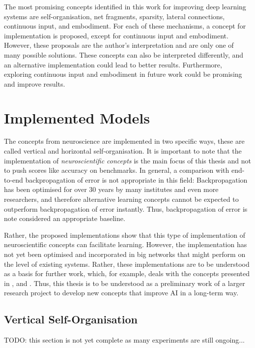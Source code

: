 The most promising concepts identified in this work for improving deep learning systems are self-organisation, net fragments, sparsity, lateral connections, continuous input, and embodiment. For each of these mechanisms, a concept for implementation is proposed, except for continuous input and embodiment. However, these proposals are the author's interpretation and are only one of many possible solutions. These concepts can also be interpreted differently, and an alternative implementation could lead to better results. Furthermore, exploring continuous input and embodiment in future work could be promising and improve results. 


\section{Implemented Models}
The concepts from neuroscience are implemented in two specific ways, these are called vertical and horizontal self-organisation. It is important to note that the implementation of \emph{neuroscientific concepts} is the main focus of this thesis and not to push scores like accuracy on benchmarks. In general, a comparison with end-to-end backpropagation of error is not appropriate in this field: Backpropagation has been optimised for over 30 years by many institutes and even more researchers, and therefore alternative learning concepts cannot be expected to outperform backpropagation of error instantly. Thus, backpropagation of error is note considered an appropriate baseline.

Rather, the proposed implementations show that this type of implementation of neuroscientific concepts can facilitate learning. However, the implementation has not yet been optimised and incorporated in big networks that might perform on the level of existing systems. Rather, these implementations are to be understood as a basis for further work, which, for example, deals with the concepts presented in ,  and . Thus, this thesis is to be understood as a preliminary work of a larger research project to develop new concepts that improve AI in a long-term way.


\subsection{Vertical Self-Organisation}
TODO: this section is not yet complete as many experiments are still ongoing...


